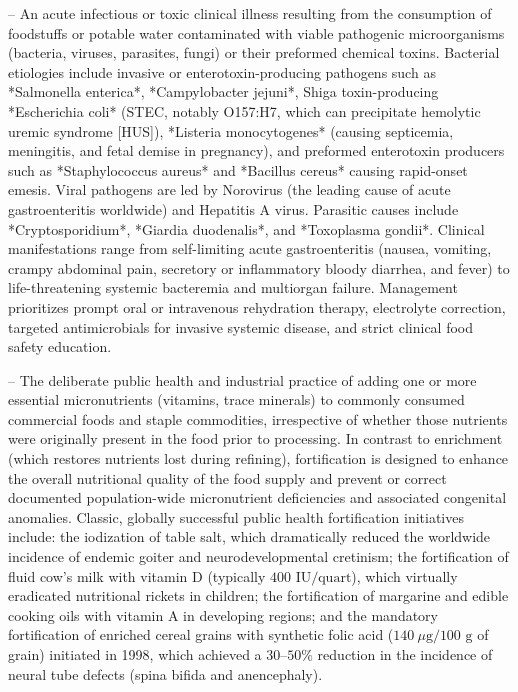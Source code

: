 -- An acute infectious or toxic clinical illness resulting from the consumption of foodstuffs or potable water contaminated with viable pathogenic microorganisms (bacteria, viruses, parasites, fungi) or their preformed chemical toxins. Bacterial etiologies include invasive or enterotoxin-producing pathogens such as *Salmonella enterica*, *Campylobacter jejuni*, Shiga toxin-producing *Escherichia coli* (STEC, notably O157:H7, which can precipitate hemolytic uremic syndrome [HUS]), *Listeria monocytogenes* (causing septicemia, meningitis, and fetal demise in pregnancy), and preformed enterotoxin producers such as *Staphylococcus aureus* and *Bacillus cereus* causing rapid-onset emesis. Viral pathogens are led by Norovirus (the leading cause of acute gastroenteritis worldwide) and Hepatitis A virus. Parasitic causes include *Cryptosporidium*, *Giardia duodenalis*, and *Toxoplasma gondii*. Clinical manifestations range from self-limiting acute gastroenteritis (nausea, vomiting, crampy abdominal pain, secretory or inflammatory bloody diarrhea, and fever) to life-threatening systemic bacteremia and multiorgan failure. Management prioritizes prompt oral or intravenous rehydration therapy, electrolyte correction, targeted antimicrobials for invasive systemic disease, and strict clinical food safety education.

-- The deliberate public health and industrial practice of adding one or more essential micronutrients (vitamins, trace minerals) to commonly consumed commercial foods and staple commodities, irrespective of whether those nutrients were originally present in the food prior to processing. In contrast to enrichment (which restores nutrients lost during refining), fortification is designed to enhance the overall nutritional quality of the food supply and prevent or correct documented population-wide micronutrient deficiencies and associated congenital anomalies. Classic, globally successful public health fortification initiatives include: the iodization of table salt, which dramatically reduced the worldwide incidence of endemic goiter and neurodevelopmental cretinism; the fortification of fluid cow's milk with vitamin D (typically $400\text{ IU/quart}$), which virtually eradicated nutritional rickets in children; the fortification of margarine and edible cooking oils with vitamin A in developing regions; and the mandatory fortification of enriched cereal grains with synthetic folic acid ($140\ \mu\text{g}/100\text{ g}$ of grain) initiated in 1998, which achieved a $30\text{--}50\%$ reduction in the incidence of neural tube defects (spina bifida and anencephaly).

